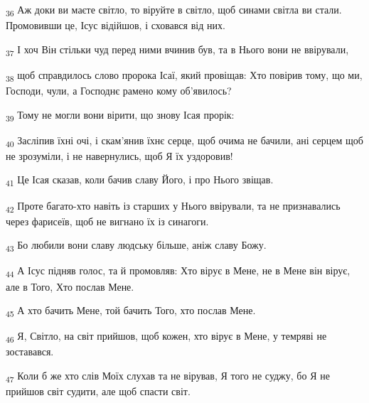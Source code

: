 \begin{tcolorbox}
\textsubscript{36} Аж доки ви маєте світло, то віруйте в світло, щоб синами світла ви стали. Промовивши це, Ісус відійшов, і сховався від них.
\end{tcolorbox}
\begin{tcolorbox}
\textsubscript{37} І хоч Він стільки чуд перед ними вчинив був, та в Нього вони не ввірували,
\end{tcolorbox}
\begin{tcolorbox}
\textsubscript{38} щоб справдилось слово пророка Ісаї, який провіщав: Хто повірив тому, що ми, Господи, чули, а Господнє рамено кому об'явилось?
\end{tcolorbox}
\begin{tcolorbox}
\textsubscript{39} Тому не могли вони вірити, що знову Ісая прорік:
\end{tcolorbox}
\begin{tcolorbox}
\textsubscript{40} Засліпив їхні очі, і скам'янив їхнє серце, щоб очима не бачили, ані серцем щоб не зрозуміли, і не навернулись, щоб Я їх уздоровив!
\end{tcolorbox}
\begin{tcolorbox}
\textsubscript{41} Це Ісая сказав, коли бачив славу Його, і про Нього звіщав.
\end{tcolorbox}
\begin{tcolorbox}
\textsubscript{42} Проте багато-хто навіть із старших у Нього ввірували, та не признавались через фарисеїв, щоб не вигнано їх із синагоги.
\end{tcolorbox}
\begin{tcolorbox}
\textsubscript{43} Бо любили вони славу людську більше, аніж славу Божу.
\end{tcolorbox}
\begin{tcolorbox}
\textsubscript{44} А Ісус підняв голос, та й промовляв: Хто вірує в Мене, не в Мене він вірує, але в Того, Хто послав Мене.
\end{tcolorbox}
\begin{tcolorbox}
\textsubscript{45} А хто бачить Мене, той бачить Того, хто послав Мене.
\end{tcolorbox}
\begin{tcolorbox}
\textsubscript{46} Я, Світло, на світ прийшов, щоб кожен, хто вірує в Мене, у темряві не зоставався.
\end{tcolorbox}
\begin{tcolorbox}
\textsubscript{47} Коли б же хто слів Моїх слухав та не вірував, Я того не суджу, бо Я не прийшов світ судити, але щоб спасти світ.
\end{tcolorbox}
